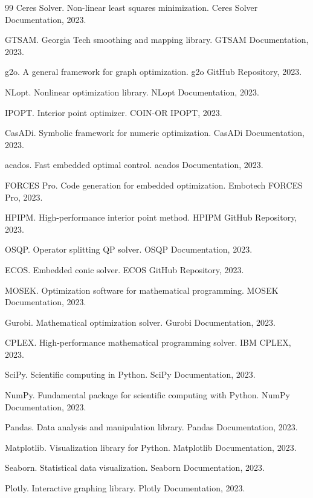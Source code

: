 \documentclass[12pt,a4paper]{ctexart}
\begin{document}
\begin{thebibliography}{99}
 Ceres Solver. Non-linear least squares minimization. Ceres Solver Documentation, 2023.

 GTSAM. Georgia Tech smoothing and mapping library. GTSAM Documentation, 2023.

 g2o. A general framework for graph optimization. g2o GitHub Repository, 2023.

 NLopt. Nonlinear optimization library. NLopt Documentation, 2023.

 IPOPT. Interior point optimizer. COIN-OR IPOPT, 2023.

 CasADi. Symbolic framework for numeric optimization. CasADi Documentation, 2023.

 acados. Fast embedded optimal control. acados Documentation, 2023.

 FORCES Pro. Code generation for embedded optimization. Embotech FORCES Pro, 2023.

 HPIPM. High-performance interior point method. HPIPM GitHub Repository, 2023.

 OSQP. Operator splitting QP solver. OSQP Documentation, 2023.

 ECOS. Embedded conic solver. ECOS GitHub Repository, 2023.

 MOSEK. Optimization software for mathematical programming. MOSEK Documentation, 2023.

 Gurobi. Mathematical optimization solver. Gurobi Documentation, 2023.

 CPLEX. High-performance mathematical programming solver. IBM CPLEX, 2023.

 SciPy. Scientific computing in Python. SciPy Documentation, 2023.

 NumPy. Fundamental package for scientific computing with Python. NumPy Documentation, 2023.

 Pandas. Data analysis and manipulation library. Pandas Documentation, 2023.

 Matplotlib. Visualization library for Python. Matplotlib Documentation, 2023.

 Seaborn. Statistical data visualization. Seaborn Documentation, 2023.

 Plotly. Interactive graphing library. Plotly Documentation, 2023.


\end{thebibliography}
\end{document}

